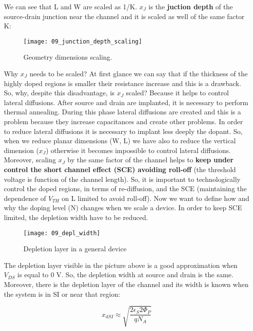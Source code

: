 \documentclass[a4paper, 12pt, twoside, openright]{report}
\begin{document}
\begin{enumerate}
We can see that L and W are scaled as 1/K. $x_{J}$ is the \textbf{juction depth} of the source-drain junction near the channel and it is scaled as well of the same factor K:

	\begin{figure}[h]
	\centering
	\texttt{[image: 09\_junction\_depth\_scaling]}
	\caption{Geometry dimensions scaling.}
	\label{}
	\end{figure}

Why $x_{J}$ needs to be scaled? At first glance we can say that if the thickness of the highly doped regions is smaller their resistance increase and this is a drawback. So, why, despite this disadvantage, is $x_{J}$ scaled? Because it helps to control lateral diffusions. After source and drain are implanted, it is necessary to perform thermal annealing. During this phase lateral diffusions are created and this is a problem because they increase capacitances and create other problems. In order to reduce lateral diffusions it is necessary to implant less deeply the dopant. So, when we reduce planar dimensions (W, L) we have also to reduce the vertical dimension ($x_{J}$) otherwise it becomes impossible to control lateral diffusions. Moreover, scaling $x_{J}$ by the same factor of the channel helps to \textbf{keep under control the short channel effect (SCE) avoiding roll-off} (the threshold voltage is function of the channel length).
So, it is important to technologically control the doped regions, in terms of re-diffusion, and the SCE (maintaining the dependence of $V_{TH}$ on L limited to avoid roll-off).
Now we want to define how and why the doping level (N) changes when we scale a device. In order to keep SCE limited, the depletion width have to be reduced.

	\begin{figure}[H]
	\centering
	\texttt{[image: 09\_depl\_width]}
	\caption{Depletion layer in a general device}
	\label{}
	\end{figure}

The depletion layer visible in the picture above is a good approximation when $V_{DS}$ is equal to 0 V. So, the depletion width at source and drain is the same. Moreover, there is the depletion layer of the channel and its width is known when the system is in SI or near that region:

	\begin{equation}
	x_{dSI} \approx \sqrt{\frac{2 \epsilon_S 2 \Phi_P}{q N_A}}
	\label{}
	\end{equation}


\end{enumerate}
\end{document}
